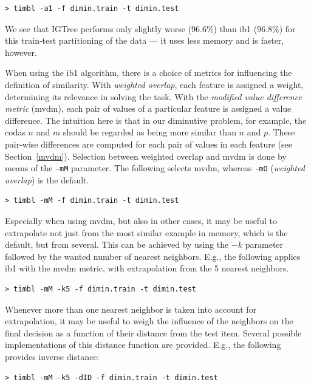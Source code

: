 \documentclass{book}
\begin{document}
{\footnotesize
\begin{verbatim}
> timbl -a1 -f dimin.train -t dimin.test
\end{verbatim}}

We see that {\sc IGTree} performs only slightly worse (96.6\%) than
{\sc ib1} (96.8\%) for this train-test partitioning of the data --- it
uses less memory and is faster, however.

When using the {\sc ib1} algorithm, there is a choice of metrics for
influencing the definition of similarity. With {\em weighted overlap},
each feature is assigned a weight, determining its relevance in
solving the task. With the {\em modified value difference metric}
({\sc mvdm}), each pair of values of a particular feature is assigned
a value difference. The intuition here is that in our diminutive
problem, for example, the codas $n$ and $m$ should be regarded as
being more similar than $n$ and $p$. These pair-wise differences are
computed for each pair of values in each feature (see
Section~\ref{mvdm}). Selection between weighted overlap and {\sc mvdm}
is done by means of the {\tt -mM} parameter. The following selects {\sc
mvdm}, whereas {\tt -mO} ({\em weighted overlap}) is the default.

{\footnotesize
\begin{verbatim}
> timbl -mM -f dimin.train -t dimin.test
\end{verbatim}
}

Especially when using {\sc mvdm}, but also in other cases, it may be
useful to extrapolate not just from the most similar example in
memory, which is the default, but from several. This can be achieved
by using the $-k$ parameter followed by the wanted number of nearest
neighbors. E.g., the following applies {\sc ib1} with the {\sc mvdm}
metric, with extrapolation from the 5 nearest neighbors.

{\footnotesize
\begin{verbatim}
> timbl -mM -k5 -f dimin.train -t dimin.test
\end{verbatim}
}

Whenever more than one nearest neighbor is taken into account for
extrapolation, it may be useful to weigh the influence of the
neighbors on the final decision as a function of their distance from
the test item. Several possible implementations of this distance
function are provided. E.g., the following provides inverse distance:

{\footnotesize
\begin{verbatim}
> timbl -mM -k5 -dID -f dimin.train -t dimin.test
\end{verbatim}
}
\end{document}
